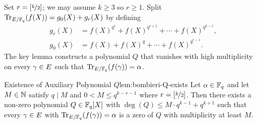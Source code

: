 Set $r=\left[\nicefrac{k}{2}\right]$; we may assume $k\geq 3$ so $r\geq 1$. Split $\operatorname{Tr}_{E/\mathbb{F}_q}(f(X))=g_0(X)+g_r(X)$ by defining
\begin{align*}
  g_r(X) & = f(X)^{q^r}+f(X)^{q^{r+1}}+\cdots +f(X)^{q^{k-1}},\\
  g_0(X) & = f(X)+f(X)^q+\cdots + f(X)^{q^{r-1}}.
\end{align*}
The key lemma constructs a polynomial $Q$ that vanishes with high multiplicity on every $\gamma\in E$ such that $\operatorname{Tr}_{E/\mathbb{F}_q}(f(\gamma))=\alpha$.
\begin{lemma}{Existence of Auxiliary Polynomial $Q$}{lem:bombieri-Q-exists}
  Let $\alpha\in\mathbb{F}_q$ and let $M\in\mathbb{N}$ satisfy $q\mid M$ and $0<M\leq q^{k-r-1}$ where $r=\left[\nicefrac{k}{2}\right]$. Then there exists a non-zero polynomial $Q\in\mathbb{F}_q[X]$ with $\deg(Q)\leq M\cdot q^{k-1}+q^{k+1}$ such that every $\gamma\in E$ with $\operatorname{Tr}_{E/\mathbb{F}_q}(f(\gamma))=\alpha$ is a zero of $Q$ with multiplicity at least $M$.
\end{lemma}
